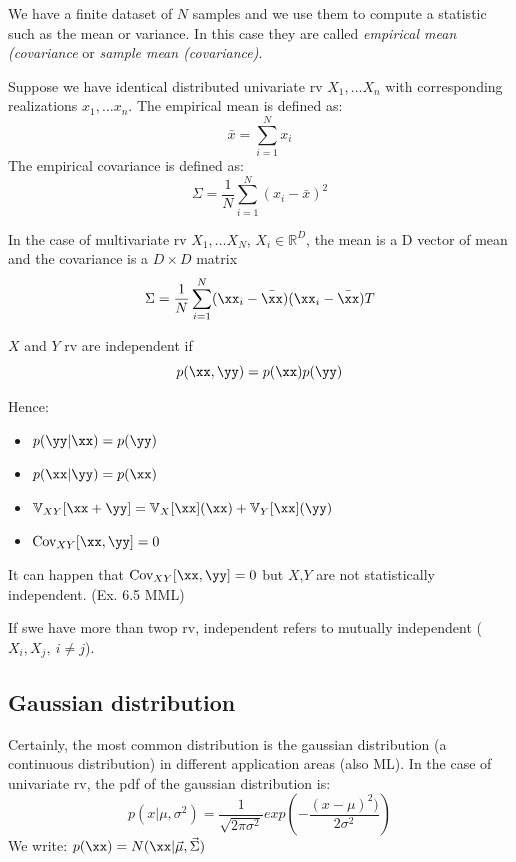 
We have a finite dataset of $N$ samples and we use them to compute a statistic such as the mean or variance. In this case they are called \textit{empirical mean (covariance} or \textit{sample mean (covariance)}.

\begin{definition}
Suppose we have identical distributed univariate rv $X_1, \ldots X_n$ with corresponding realizations $x_1, \ldots x_n$. The empirical mean is defined as:
$$\bar x=\sum_{i=1}^N x_i $$
The empirical covariance is defined as:
$$\Sigma=\frac{1}{N} \sum_{i=1}^N (x_i-\bar x)^2$$
\end{definition}
In the case of multivariate rv $X_1, \ldots X_N$, $X_i \in \mathbb{R}^D$, the mean is a D vector of mean and the covariance is a $D \times D$ matrix 
$$\Sigma=\frac{1}{N} \sum_{i=1}^N (\xx_i-\bar \xx) (\xx_i-\bar \xx)T$$


\begin{definition}
$X$ and $Y$ rv are independent if  $$p(\xx,\yy)=p(\xx)p(\yy)$$
\end{definition}

Hence:
\begin{itemize}
    \item $p(\yy|\xx)=p(\yy)$
    \item $p(\xx|\yy)=p(\xx)$
    \item $\mathbb{V}_{XY}{[\xx+\yy]}=\mathbb{V}_X[\xx](\xx)+\mathbb{V}_Y[\xx](\yy)$
    \item $\text{Cov}_{XY}[\xx,\yy]=0$
\end{itemize}

It can happen that $\text{Cov}_{XY}[\xx,\yy]=0$ but $X$,$Y$ are not statistically independent. (Ex. 6.5 MML)

If swe have more than twop rv, independent refers to mutually independent ($X_i, X_j, \ i\neq j$).

\subsection{Gaussian distribution}

Certainly, the most common distribution is the gaussian distribution (a continuous distribution)  in different application areas (also ML).
In the case of univariate rv, the pdf of the gaussian distribution is:
$$p(x|\mu, \sigma^2)=\frac{1}{\sqrt{2 \pi \sigma^2}} exp \left(-\frac{(x-\mu)^2)}{2\sigma^2}\right)$$
We write: $p(\xx)={N} (\xx|\vec{\mu},\vec{\Sigma})$

